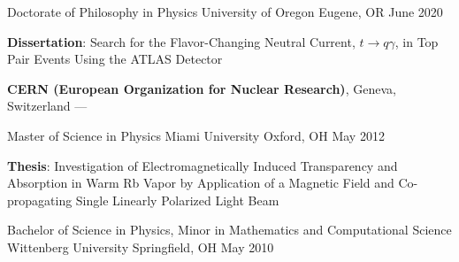 
\begin{cventries}
  \cventry
    {Doctorate of Philosophy in Physics} %
    {University of Oregon} %
    {Eugene, OR} %
    {June 2020} %
    {
      \begin{cvitems} %
         \item {\textbf{Dissertation}: Search for the Flavor-Changing Neutral Current, $t\rightarrow q \gamma$, in Top Pair Events Using the ATLAS Detector}
         \vspace{0.5mm}
         \item {\textbf{CERN (European Organization for Nuclear Research)}, Geneva, Switzerland --- }
      \end{cvitems}
    }

      \cventry
    {Master of Science in Physics} %
    {Miami University} %
    {Oxford, OH} %
    {May 2012} %
    {
      \begin{cvitems} %
         \item {\textbf{Thesis}: Investigation of Electromagnetically Induced Transparency and Absorption in Warm Rb Vapor by Application of a Magnetic Field and Co-propagating Single Linearly Polarized Light Beam}
      \end{cvitems}
    }    
      \cventry
    {Bachelor of Science in Physics, Minor in Mathematics and Computational Science} %
    {Wittenberg University} %
    {Springfield, OH} %
    {May 2010} %
    {
    }
\end{cventries}
